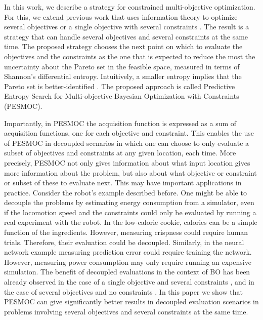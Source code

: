 \documentclass[review,preprint,12pt]{elsarticle}
\begin{document}
In this work, we describe a strategy for constrained multi-objective 
optimization. For this, we extend previous work that uses information theory 
to optimize several objectives \citep{hernandez2016} or a single objective with 
several constraints \citep{hernandez2015predictive}. The result is a strategy that 
can handle several objectives and several constraints at the same time. The proposed 
strategy chooses the next point on which to evaluate the objectives and the constraints 
as the one that is expected to reduce the most the uncertainty about the Pareto set 
in the feasible space, measured in terms of Shannon's differential entropy. 
Intuitively, a smaller entropy implies that the Pareto set is better-identified 
\citep{villemonteix2009informational,hennig2012entropy,hernandez2014predictive}. 
The proposed approach is called Predictive Entropy Search for Multi-objective Bayesian 
Optimization with Constraints (PESMOC).

Importantly, in PESMOC the acquisition function is expressed as a sum of acquisition 
functions, one for each objective and constraint. This enables the use of PESMOC in 
decoupled scenarios in which one can choose to only evaluate a subset of objectives and constraints 
at any given location, each time. More precisely, PESMOC not only 
gives information about what input location gives more information about the problem, 
but also about what objective or constraint or subset of these to evaluate next. This 
may have important applications in practice. Consider the robot's example 
described before. One might be able to decouple the problems by estimating energy 
consumption from a simulator, even if the locomotion speed and the constraints could 
only be evaluated by running a real experiment with the robot. In the low-calorie cookie, 
calories can be a simple function of the ingredients. However, measuring crispness could 
require human trials. Therefore, their evaluation could be decoupled. 
Similarly, in the neural network example measuring prediction error could require 
training the network. However, measuring power consumption may only require running 
an expensive simulation. The benefit of decoupled evaluations in the context of BO 
has been already observed in the case of a single objective and several constraints \citep{hernandez2016general},
and in the case of several objectives and no constraints \citep{hernandez2016predictive}.
In this paper we show that PESMOC can give significantly better results in decoupled evaluation scenarios
in problems involving several objectives and several constraints at the same time. 
\end{document}
